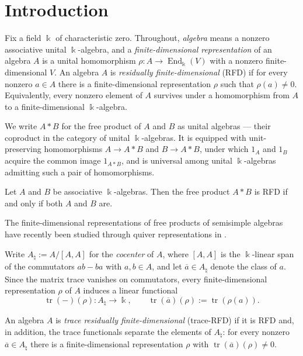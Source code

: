 \section{Introduction}

Fix a field \(\Bbbk\) of characteristic zero. Throughout, \emph{algebra} means a nonzero associative unital \(\Bbbk\)-algebra, and a \emph{finite-dimensional representation} of an algebra \(A\) is a unital homomorphism \(\rho\colon A\to\operatorname{End}_{\Bbbk}(V)\) with a nonzero finite-dimensional \(V\).
An algebra \(A\) is \emph{residually finite-dimensional} (RFD) if for every nonzero \(a\in A\) there is a finite-dimensional representation \(\rho\) such that \(\rho(a)\neq0\). Equivalently, every nonzero element of \(A\) survives under a homomorphism from \(A\) to a finite-dimensional \(\Bbbk\)-algebra.

We write \(A*B\) for the free product of \(A\) and \(B\) as unital algebras --- their coproduct in the category of unital \(\Bbbk\)-algebras. It is equipped with unit-preserving homomorphisms \(A\to A*B\) and \(B\to A*B\), under which \(1_A\) and \(1_B\) acquire the common image \(1_{A*B}\), and is universal among unital \(\Bbbk\)-algebras admitting such a pair of homomorphisms.

\begin{theorem}\label{thm_rfd_free_product}
    Let \(A\) and \(B\) be associative \(\Bbbk\)-algebras. Then the free product \(A*B\) is RFD if and only if both \(A\) and \(B\) are.
\end{theorem}

The finite-dimensional representations of free products of semisimple algebras have recently been studied through quiver representations in \cite{BuchananDimitrovGracePaquetteWehlauXu2024}.

Write \(A_{\natural}:=A/[A,A]\) for the \emph{cocenter} of \(A\), where \([A,A]\) is the \(\Bbbk\)-linear span of the commutators \(ab-ba\) with \(a,b\in A\), and let \(\overline{a}\in A_{\natural}\) denote the class of \(a\).
Since the matrix trace vanishes on commutators, every finite-dimensional representation \(\rho\) of \(A\) induces a linear functional
\begin{equation}
    \operatorname{tr}(-)(\rho)\colon A_{\natural}\to\Bbbk,\qquad \operatorname{tr}(\overline{a})(\rho):=\operatorname{tr}(\rho(a)).
\end{equation}

\begin{definition}\label{def_trace_rfd}
    An algebra \(A\) is \emph{trace residually finite-dimensional} (trace-RFD) if it is RFD and, in addition, the trace functionals separate the elements of \(A_{\natural}\): for every nonzero \(\overline{a}\in A_{\natural}\) there is a finite-dimensional representation \(\rho\) with \(\operatorname{tr}(\overline{a})(\rho)\neq0\).
\end{definition}

